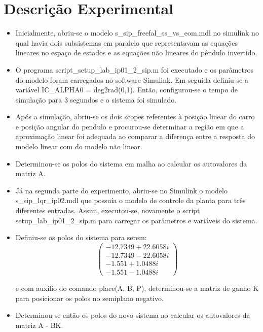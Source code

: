 \documentclass[journal]{IEEEtran}
\begin{document}
\section{Descrição Experimental}
\begin{itemize}
 \item 
  Inicialmente, abriu-se o modelo s\_sip\_freefal\_ss\_vs\_eom.mdl no 
simulink no qual havia dois subsistemas em paralelo que representavam 
as equações lineares no espaço de estados e as equações não lineares 
do pêndulo invertido. 

  \item
  O programa script\_setup\_lab\_ip01\_2\_sip.m foi executado e os 
parâmetros do modelo foram carregados no software Simulink. Em 
seguida definiu-se a variável  IC\_ALPHA0 = deg2rad(0,1). Então, 
configurou-se o tempo de simulação para 3 segundos e o sistema foi 
simulado.


\item
Após a simulação, abriu-se os dois scopes referentes à 
posição linear do carro e posição angular do pendulo e procurou-se 
determinar a região em que a aproximação linear foi adequada ao 
comparar a diferença entre a resposta do modelo linear com do modelo 
não linear.

\item
Determinou-se os polos do sistema em malha ao calcular os
autovalores da matriz A.


\item 
Já na segunda parte do experimento, abriu-se no Simulink o 
modelo  s\_sip\_lqr\_ip02.mdl que possuía o modelo de controle da 
planta para três diferentes entradas.
Assim, executou-se, novamente o script setup\_lab\_ip01\_2\_sip.m 
para carregar os parâmetros e variáveis do sistema.

\item
Definiu-se os polos do sistema para serem:
\begin{displaymath}
\left(
 \begin{array}{l}
-12.7349 + 22.6058i \\
-12.7349 - 22.6058i \\
-1.551 + 1.0488i \\
-1.551 - 1.0488i
 \end{array}
\right)
\end{displaymath}

e com auxílio do comando place(A, B, P), determinou-se a matriz de 
ganho K para posicionar os polos no semiplano negativo. 

\item Determinou-se então os polos do novo sistema ao calcular os
autovalores da matriz A - BK.


\end{itemize}
\end{document}
